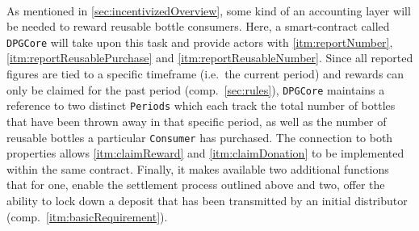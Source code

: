 \begin{description}[format={\storedescriptionlabel}]
	\item[Accounting\label{itm:accounting}]
	\hfill \\
	As mentioned in \autoref{sec:incentivizedOverview}, some kind of an accounting layer will be needed to reward reusable bottle consumers. Here, a smart-contract called \texttt{DPGCore} will take upon this task and provide actors with \ref{itm:reportNumber}, \ref{itm:reportReusablePurchase} and \ref{itm:reportReusableNumber}. Since all reported figures are tied to a specific timeframe (i.e.~the current period) and rewards can only be claimed for the past period (comp.~\ref{sec:rules}), \texttt{DPGCore} maintains a reference to two distinct \texttt{Periods} which each track the total number of bottles that have been thrown away in that specific period, as well as the number of reusable bottles a particular \texttt{Consumer} has purchased. The connection to both properties allows \ref{itm:claimReward} and \ref{itm:claimDonation} to be implemented within the same contract. Finally, it makes available two additional functions that for one, enable the settlement process outlined above and two, offer the ability to lock down a deposit that has been transmitted by an initial distributor (comp.~\ref{itm:basicRequirement}). 
	

\end{description}

